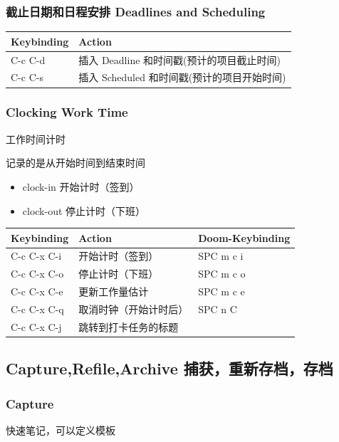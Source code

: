 \documentclass[11pt]{article}
\begin{document}
\subsubsection{截止日期和日程安排 Deadlines and Scheduling}
\label{sec:org2e0519e}

\begin{center}
\begin{tabular}{ll}
Keybinding & Action\\[0pt]
\hline
C-c C-d & 插入 Deadline 和时间戳(预计的项目截止时间)\\[0pt]
C-c C-s & 插入 Scheduled 和时间戳(预计的项目开始时间)\\[0pt]
\end{tabular}
\end{center}
\subsubsection{Clocking Work Time}
\label{sec:org30b6f87}

工作时间计时

记录的是从开始时间到结束时间
\begin{itemize}
\item clock-in
开始计时（签到）
\item clock-out
停止计时（下班）
\end{itemize}

\begin{center}
\begin{tabular}{lll}
Keybinding & Action & Doom-Keybinding\\[0pt]
\hline
C-c C-x C-i & 开始计时（签到） & SPC m c i\\[0pt]
C-c C-x C-o & 停止计时（下班） & SPC m c o\\[0pt]
C-c C-x C-e & 更新工作量估计 & SPC m c e\\[0pt]
C-c C-x C-q & 取消时钟（开始计时后） & SPC n C\\[0pt]
C-c C-x C-j & 跳转到打卡任务的标题 & \\[0pt]
\end{tabular}
\end{center}

\subsection{Capture,Refile,Archive 捕获，重新存档，存档}
\label{sec:org3b59f85}

\subsubsection{Capture}
\label{sec:org699c82a}
快速笔记，可以定义模板
\end{document}
